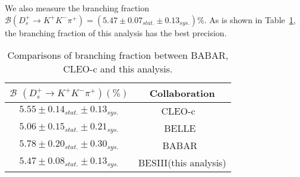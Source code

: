 {   
    
    We also measure the branching fraction $\mathcal{B}(D_{s}^{+} \rightarrow K^{+}K^{-}\pi^{+})=(5.47\pm0.07_{stat.}\pm0.13_{sys.})\%$.
    As is shown in Table~\ref{BF-Compare}, the branching fraction of this analysis has the best precision.
    \begin{table}[htbp]
        \caption{Comparisons of branching fraction between BABAR, CLEO-c and this analysis.}
        \label{BF-Compare}
        \begin{center}
            \begin{tabular}{cc}
                \toprule\toprule
                $\mathcal{B}$ $(D_{s}^{+} \rightarrow K^{+}K^{-}\pi^{+})(\%)$ & Collaboration  \\
                \hline
                $5.55\pm0.14_{stat.}\pm0.13_{sys.}$    &  CLEO-c ~\cite{CLEO-BF}                     \\
                $5.06\pm0.15_{stat.}\pm0.21_{sys.}$    &  BELLE~\cite{BELL-BF}                     \\
                $5.78\pm0.20_{stat.}\pm0.30_{sys.}$    &  BABAR~\cite{BABAR-BF}                    \\
                $5.47\pm0.08_{stat.}\pm0.13_{sys.}$                     &  BESIII(this analysis)    \\
                \bottomrule\bottomrule
            \end{tabular}
        \end{center}
    \end{table}
    
}
